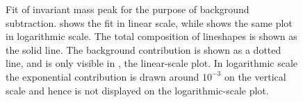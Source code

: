  \begin{figure}[htb]
  \begin{center}
  \end{center}
  \caption[\fixspacing Functional fit of \Zee invariant mass peak 
    for background subtraction]{
    \fixspacing Fit of \Zee invariant mass peak for the purpose 
    of background subtraction.  
    shows the fit in linear 
    scale, while 
    shows the 
    same plot in logarithmic scale.  
    The total composition of lineshapes is shown as the 
    solid line.  
    The background contribution is shown as a dotted line, 
    and is only visible in 
    , 
    the linear-scale plot.  
    In logarithmic scale the exponential contribution is
    drawn around $10^{-3}$ on the vertical scale 
    and hence is not displayed 
    on the logarithmic-scale plot.  
  }
  \label{fig:ZFit}
 \end{figure}

